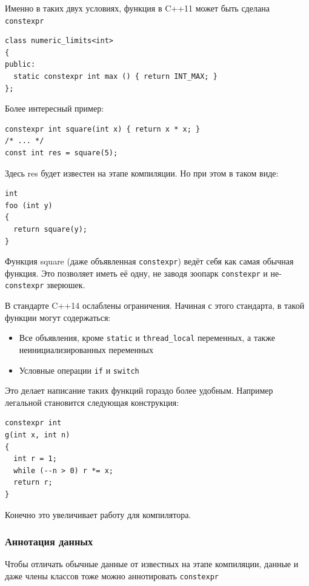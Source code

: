 \documentclass[a4paper,12pt,oneside]{article}
\begin{document}
Именно в таких двух условиях, функция в C++11 может быть сделана \lstinline!constexpr!

\begin{lstlisting}
class numeric_limits<int>
{
public:
  static constexpr int max () { return INT_MAX; }
};
\end{lstlisting}

Более интересный пример:

\begin{lstlisting}
constexpr int square(int x) { return x * x; }
/* ... */
const int res = square(5);
\end{lstlisting}

Здесь res будет известен на этапе компиляции. Но при этом в таком виде:

\begin{lstlisting}
int
foo (int y)
{
  return square(y);
}
\end{lstlisting}

Функция square (даже объявленная \lstinline!constexpr!) ведёт себя как самая обычная функция. Это позволяет иметь её одну, не заводя зоопарк \lstinline!constexpr! и не-\lstinline!constexpr! зверюшек.

В стандарте C++14 ослаблены ограничения. Начиная с этого стандарта, в такой функции могут содержаться:

\begin{itemize}
\item Все объявления, кроме \lstinline!static! и \lstinline!thread_local! переменных, а также неинициализированных переменных
\item Условные операции \lstinline!if! и \lstinline!switch!
\end{itemize}

Это делает написание таких функций гораздо более удобным. Например легальной становится следующая конструкция:

\begin{lstlisting}
constexpr int 
g(int x, int n) 
{ 
  int r = 1;
  while (--n > 0) r *= x;
  return r;
}
\end{lstlisting}

Конечно это увеличивает работу для компилятора.

\subsubsection{Аннотация данных}

Чтобы отличать обычные данные от известных на этапе компиляции, данные и даже члены классов тоже можно аннотировать \lstinline!constexpr!
\end{document}
